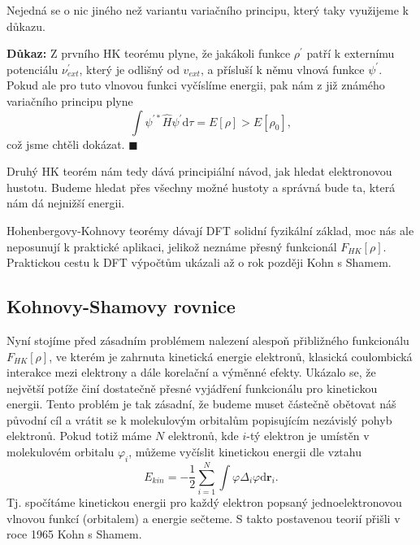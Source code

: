 Nejedná se o nic jiného než variantu variačního principu, který taky využijeme k důkazu.

\bigskip
\textbf{Důkaz:} Z prvního HK teorému plyne, že jakákoli funkce $\rho^{\prime}$ patří k externímu potenciálu $\nu_{ext}^{\prime}$, který je odlišný od $v_{ext}$, a přísluší k němu vlnová funkce $\psi^{\prime}$. Pokud ale pro tuto vlnovou funkci vyčíslíme energii, pak nám z již známého variačního principu plyne
\begin{equation}
\int \psi^{\prime *} \hat{H} \psi^{\prime} \mathrm{d}\tau = E[\rho] > E [\rho_0],
\end{equation}
což jsme chtěli dokázat. \hfill {\footnotesize $\blacksquare$}

Druhý HK teorém nám tedy dává principiální návod, jak hledat elektronovou hustotu. Budeme hledat přes všechny možné hustoty a správná bude ta, která nám dá nejnižší energii.

Hohenbergovy-Kohnovy teorémy dávají DFT solidní fyzikální základ, moc nás ale neposunují k praktické aplikaci, jelikož neznáme přesný funkcionál $F_{HK}[\rho]$.
Praktickou cestu k DFT výpočtům ukázali až o rok později Kohn s Shamem.

\subsection{Kohnovy-Shamovy rovnice}

Nyní stojíme před zásadním problémem nalezení alespoň přibližného funkcionálu $F_{HK}[\rho]$, ve kterém je zahrnuta kinetická energie elektronů, klasická coulombická interakce mezi elektrony a dále korelační a výměnné efekty. 
Ukázalo se, že největší potíže činí dostatečně přesné vyjádření funkcionálu pro kinetickou energii.
Tento problém je tak zásadní, že budeme muset částečně obětovat náš původní cíl a vrátit se k molekulovým orbitalům popisujícím nezávislý pohyb elektronů.
Pokud totiž máme $N$ elektronů, kde $i$-tý elektron je umístěn v molekulovém orbitalu $\varphi_i$, můžeme vyčíslit kinetickou energii dle vztahu
\begin{equation}
E_{kin}=-\frac{1}{2}\sum_{i=1}^N \int \varphi \Delta_i \varphi \mathrm{d}\textbf{r}_i .
\end{equation}
Tj. spočítáme kinetickou energii pro každý elektron popsaný jednoelektronovou vlnovou funkcí (orbitalem) a energie sečteme. S takto postavenou teorií přišli v roce 1965 Kohn s Shamem.

